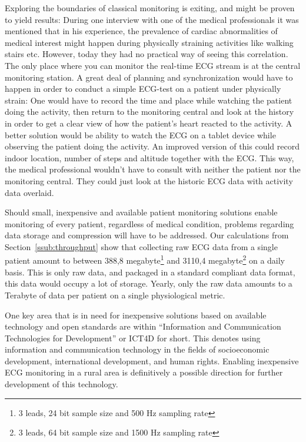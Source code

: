Exploring the boundaries of classical monitoring is exiting, and might be proven to yield results: During one interview with one of the medical professionals it was mentioned that in his experience, the prevalence of cardiac abnormalities of medical interest might happen during physically straining activities like walking stairs etc. However, today they had no practical way of seeing this correlation. The only place where you can monitor the real-time ECG stream is at the central monitoring station. A great deal of planning and synchronization would have to happen in order to conduct a simple ECG-test on a patient under physically strain: One would have to record the time and place while watching the patient doing the activity, then return to the monitoring central and look at the history in order to get a clear view of how the patient's heart reacted to the activity. A better solution would be ability to watch the ECG on a tablet device while observing the patient doing the activity. An improved version of this could record indoor location, number of steps and altitude together with the ECG. This way, the medical professional wouldn't have to consult with neither the patient nor the monitoring central. They could just look at the historic ECG data with activity data overlaid.

Should small, inexpensive and available patient monitoring solutions enable monitoring of every patient, regardless of medical condition, problems regarding data storage and compression will have to be addressed. Our calculations from Section~\ref{ssub:throughput} show that collecting raw ECG data from a single patient amount to between 388,8 megabyte\footnote{3 leads, 24 bit sample size and 500 Hz sampling rate} and 3110,4 megabyte\footnote{3 leads, 64 bit sample size and 1500 Hz sampling rate} on a daily basis. This is only raw data, and packaged in a standard compliant data format, this data would occupy a lot of storage. Yearly, only the raw data amounts to a Terabyte of data per patient on a single physiological metric.

One key area that is in need for inexpensive solutions based on available technology and open standards are within ``Information and Communication Technologies for Development'' or ICT4D for short. This denotes using information and communication technology in the fields of socioeconomic development, international development, and human rights. Enabling inexpensive ECG monitoring in a rural area is definitively a possible direction for further development of this technology.


